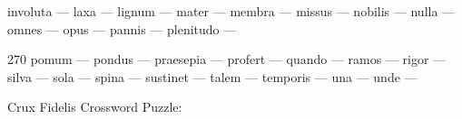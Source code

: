 \documentclass[12pt]{article}
\begin{document}
\pagestyle{fancy}
\fancyhf{}
\renewcommand{\headrulewidth}{0pt}
\renewcommand{\footrulewidth}{0pt}
\libertine
\renewcommand\PuzzleClueFont{\rm\normalsize}
\noindent\begin{rotate}{0}
\small
involuta --- laxa --- lignum --- mater --- membra --- missus --- nobilis --- nulla --- omnes --- opus --- pannis --- plenitudo ---
\end{rotate}
\hfill
\begin{rotate}{270}
\small  pomum --- pondus ---  praesepia --- profert --- quando --- ramos --- rigor --- silva --- sola --- spina --- sustinet --- talem --- temporis --- una --- unde --- 
\end{rotate}
\begin{center}
  \huge{Crux Fidelis Crossword Puzzle:}
\end{center}
\vspace{1.5cm}
\end{document}
